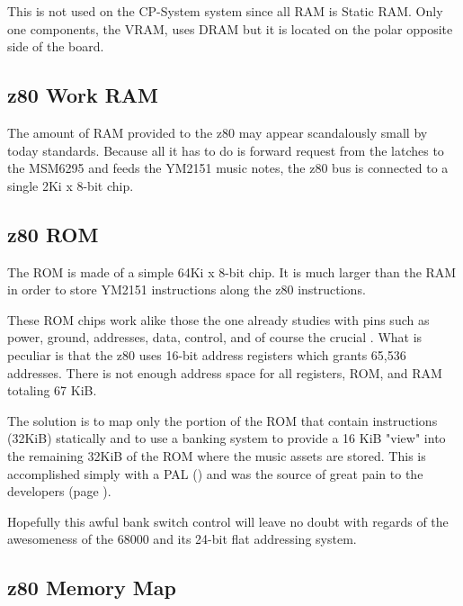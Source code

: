  This is not used on the CP-System system since all RAM is Static RAM. Only one components, the VRAM, uses DRAM but it is located on the polar opposite side of the board.

\pagebreak

\subsection{z80 Work RAM}
The amount of RAM provided to the z80 may appear scandalously small by today standards. Because all it has to do is forward request from the latches to the MSM6295 and feeds the YM2151 music notes, the z80 bus is connected to a single 2Ki x 8-bit  chip.

\subsection{z80 ROM}
The ROM is made of a simple 64Ki x 8-bit  chip. It is much larger than the RAM in order to store YM2151 instructions along the z80 instructions. 


These ROM chips work alike those the one already studies with pins such as power, ground, addresses, data, control, and of course the crucial . What is peculiar is that the z80 uses 16-bit address registers which grants 65,536 addresses. There is not enough address space for all registers, ROM, and RAM totaling 67 KiB.

The solution is to map only the portion of the ROM that contain instructions (32KiB) statically and to use a banking system to provide a 16 KiB "view" into the remaining 32KiB of the ROM where the music assets are stored. This is accomplished simply with a PAL () and was the source of great pain to the developers (page ).


Hopefully this awful bank switch control 
 will leave no doubt with regards of the awesomeness of the 68000 and its 24-bit flat addressing system. 

\subsection{z80 Memory Map}

